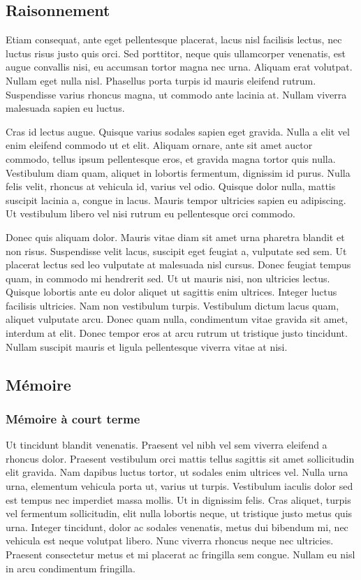 \subsection{Raisonnement}

Etiam consequat, ante eget pellentesque placerat, lacus nisl facilisis lectus, nec luctus risus justo quis orci. Sed porttitor, neque quis ullamcorper venenatis, est augue convallis nisi, eu accumsan tortor magna nec urna. Aliquam erat volutpat. Nullam eget nulla nisl. Phasellus porta turpis id mauris eleifend rutrum. Suspendisse varius rhoncus magna, ut commodo ante lacinia at. Nullam viverra malesuada sapien eu luctus. 

Cras id lectus augue. Quisque varius sodales sapien eget gravida. Nulla a elit vel enim eleifend commodo ut et elit. Aliquam ornare, ante sit amet auctor commodo, tellus ipsum pellentesque eros, et gravida magna tortor quis nulla. Vestibulum diam quam, aliquet in lobortis fermentum, dignissim id purus. Nulla felis velit, rhoncus at vehicula id, varius vel odio. Quisque dolor nulla, mattis suscipit lacinia a, congue in lacus. Mauris tempor ultricies sapien eu adipiscing. Ut vestibulum libero vel nisi rutrum eu pellentesque orci commodo. 

Donec quis aliquam dolor. Mauris vitae diam sit amet urna pharetra blandit et non risus. Suspendisse velit lacus, suscipit eget feugiat a, vulputate sed sem. Ut placerat lectus sed leo vulputate at malesuada nisl cursus. Donec feugiat tempus quam, in commodo mi hendrerit sed. Ut ut mauris nisi, non ultricies lectus. Quisque lobortis ante eu dolor aliquet ut sagittis enim ultrices. Integer luctus facilisis ultricies. Nam non vestibulum turpis. Vestibulum dictum lacus quam, aliquet vulputate arcu. Donec quam nulla, condimentum vitae gravida sit amet, interdum at elit. Donec tempor eros at arcu rutrum ut tristique justo tincidunt. Nullam suscipit mauris et ligula pellentesque viverra vitae at nisi. 

\subsection{Mémoire}
\subsubsection{Mémoire à court terme}

Ut tincidunt blandit venenatis. Praesent vel nibh vel sem viverra eleifend a rhoncus dolor. Praesent vestibulum orci mattis tellus sagittis sit amet sollicitudin elit gravida. Nam dapibus luctus tortor, ut sodales enim ultrices vel. Nulla urna urna, elementum vehicula porta ut, varius ut turpis. Vestibulum iaculis dolor sed est tempus nec imperdiet massa mollis. Ut in dignissim felis. Cras aliquet, turpis vel fermentum sollicitudin, elit nulla lobortis neque, ut tristique justo metus quis urna. Integer tincidunt, dolor ac sodales venenatis, metus dui bibendum mi, nec vehicula est neque volutpat libero. Nunc viverra rhoncus neque nec ultricies. Praesent consectetur metus et mi placerat ac fringilla sem congue. Nullam eu nisl in arcu condimentum fringilla. 


